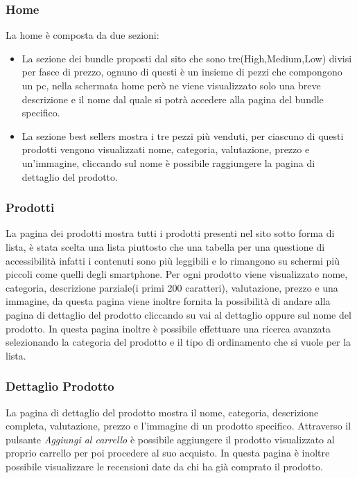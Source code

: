 \subsubsection{Home}
La home è composta da due sezioni:
\begin{itemize}
	\item La sezione dei bundle proposti dal sito che sono tre(High,Medium,Low) divisi per fasce di prezzo, ognuno di questi è un insieme di pezzi che compongono un pc, nella schermata home però ne viene visualizzato solo una breve descrizione e il nome dal quale si potrà accedere alla pagina del bundle specifico.
	\item La sezione best sellers mostra i tre pezzi più venduti, per ciascuno di questi prodotti vengono visualizzati nome, categoria, valutazione, prezzo e un'immagine, cliccando sul nome è possibile raggiungere la pagina di dettaglio del prodotto.
\end{itemize}

\subsubsection{Prodotti}
La pagina dei prodotti mostra tutti i prodotti presenti nel sito sotto forma di lista, è stata scelta una lista piuttosto che una tabella per una questione di accessibilità infatti i contenuti sono più leggibili e lo rimangono su schermi più piccoli come quelli degli smartphone.\newline
Per ogni prodotto viene visualizzato nome, categoria, descrizione parziale(i primi 200 caratteri), valutazione, prezzo e una immagine, da questa pagina viene inoltre fornita la possibilità di andare alla pagina di dettaglio del prodotto cliccando su vai al dettaglio oppure sul nome del prodotto.\newline
In questa pagina inoltre è possibile effettuare una ricerca avanzata selezionando la categoria del prodotto e il tipo di ordinamento che si vuole per la lista.

\subsubsection{Dettaglio Prodotto}
La pagina di dettaglio del prodotto mostra il nome, categoria, descrizione completa, valutazione, prezzo e l'immagine di un prodotto specifico.\newline
Attraverso il pulsante \emph{Aggiungi al carrello} è possibile aggiungere il prodotto visualizzato al proprio carrello per poi procedere al suo acquisto.\newline
In questa pagina è inoltre possibile visualizzare le recensioni date da chi ha già comprato il prodotto.

